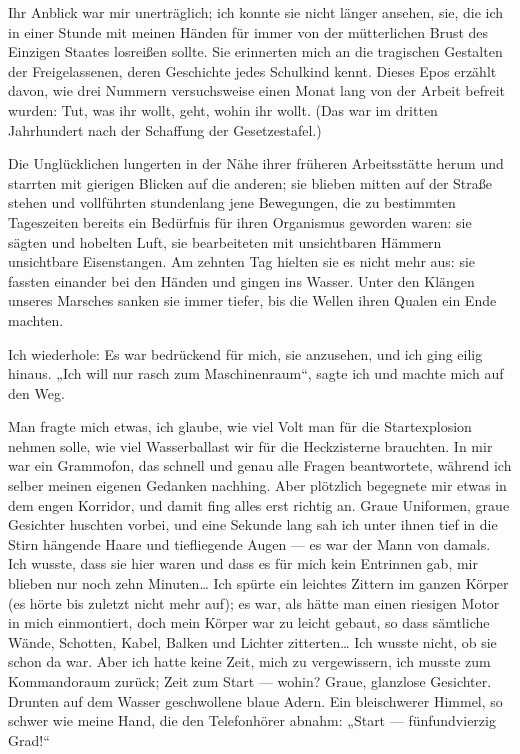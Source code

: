 Ihr Anblick war mir unerträglich; ich konnte sie nicht länger
ansehen, sie, die ich in einer Stunde mit meinen Händen für immer
von der mütterlichen Brust des Einzigen Staates losreißen sollte.
Sie erinnerten mich an die tragischen Gestalten der Freigelassenen,
deren Geschichte jedes Schulkind kennt. Dieses Epos erzählt davon,
wie drei Nummern versuchsweise einen Monat lang von der Arbeit
befreit wurden: Tut, was ihr wollt, geht, wohin ihr wollt. (Das war
im dritten Jahrhundert nach der Schaffung der Gesetzestafel.)

Die Unglücklichen lungerten in der Nähe ihrer früheren
Arbeitsstätte herum und starrten mit gierigen Blicken auf die
anderen; sie blieben mitten auf der Straße stehen und vollführten
stundenlang jene Bewegungen, die zu bestimmten Tageszeiten bereits
ein Bedürfnis für ihren Organismus geworden waren: sie sägten und
hobelten Luft, sie bearbeiteten mit unsichtbaren Hämmern
unsichtbare Eisenstangen. Am zehnten Tag hielten sie es nicht mehr
aus: sie fassten einander bei den Händen und gingen ins Wasser.
Unter den Klängen unseres Marsches sanken sie immer tiefer, bis die
Wellen ihren Qualen ein Ende machten.

Ich wiederhole: Es war bedrückend für mich, sie anzusehen, und ich
ging eilig hinaus. „Ich will nur rasch zum Maschinenraum“, sagte
ich und machte mich auf den Weg.

Man fragte mich etwas, ich glaube, wie viel Volt man für die
Startexplosion nehmen solle, wie viel Wasserballast
wir für die Heckzisterne brauchten. In mir war ein Grammofon, das
schnell und genau alle Fragen beantwortete, während ich selber
meinen eigenen Gedanken nachhing. Aber plötzlich begegnete mir
etwas in dem engen Korridor, und damit fing alles erst richtig an.
Graue Uniformen, graue Gesichter huschten vorbei, und eine Sekunde
lang sah ich unter ihnen tief in die Stirn hängende Haare und
tiefliegende Augen — es war der Mann von damals. Ich wusste, dass
sie hier waren und dass es für mich kein Entrinnen gab, mir blieben
nur noch zehn Minuten\ldots{} Ich spürte ein leichtes Zittern im ganzen
Körper (es hörte bis zuletzt nicht mehr auf); es war, als hätte man
einen riesigen Motor in mich einmontiert, doch mein Körper war zu
leicht gebaut, so dass sämtliche Wände, Schotten, Kabel, Balken und
Lichter zitterten\ldots{} Ich wusste nicht, ob sie schon da war. Aber
ich hatte keine Zeit, mich zu vergewissern, ich musste zum
Kommandoraum zurück; Zeit zum Start — wohin? Graue, glanzlose
Gesichter. Drunten auf dem Wasser geschwollene blaue Adern. Ein
bleischwerer Himmel, so schwer wie meine Hand, die den Telefonhörer
abnahm: „Start — fünfundvierzig Grad!“

